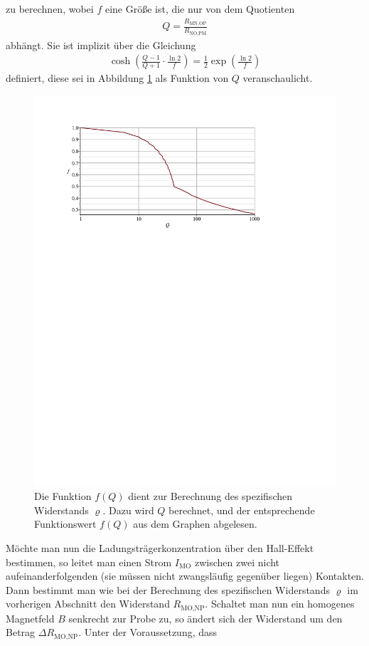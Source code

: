 \documentclass[a4paper,12pt]{article}
\begin{document}
zu berechnen, wobei $f$ eine Größe ist, die nur von dem Quotienten
\begin{align}
Q=\frac{R_\text{MN,OP}}{R_\text{NO,PM}}
\end{align}
abhängt. Sie ist implizit über die Gleichung
\begin{align}
\cosh\left(\frac{Q-1}{Q+1}\cdot\frac{\ln 2}{f}\right)=\frac{1}{2}\exp\left(\frac{\ln 2}{f}\right)
\end{align}
definiert, diese sei in Abbildung \ref{fig:f(Q)} als Funktion von $Q$ veranschaulicht.\\
\begin{figure}[h]
\centering
\includegraphics[scale=0.9]{f(Q).pdf}
\caption{Die Funktion $f(Q)$ dient zur Berechnung des spezifischen Widerstands $\varrho$. Dazu wird $Q$ berechnet, und der entsprechende Funktionswert $f(Q)$ aus dem Graphen abgelesen.}
\label{fig:f(Q)}
\end{figure}
Möchte man nun die Ladungsträgerkonzentration über den Hall-Effekt bestimmen, so leitet man einen Strom $I_\text{MO}$ zwischen zwei nicht aufeinanderfolgenden (sie müssen nicht zwangsläufig gegenüber liegen) Kontakten. Dann bestimmt man wie bei der Berechnung des spezifischen Widerstands $\varrho$ im vorherigen Abschnitt den Widerstand $R_\text{MO,NP}$. Schaltet man nun ein homogenes Magnetfeld $B$ senkrecht zur Probe zu, so ändert sich der Widerstand um den Betrag $\Delta R_\text{MO,NP}$. Unter der Voraussetzung, dass
\end{document}
